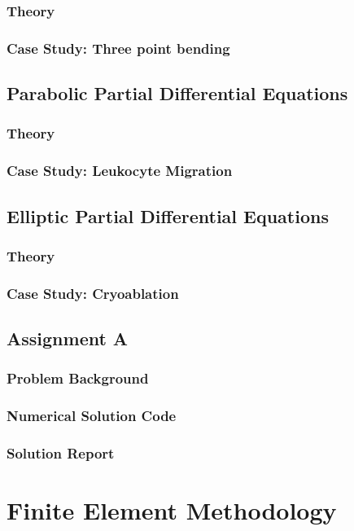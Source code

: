 \documentclass[a4paper, 11pt, oneside]{bookest}
\theoremstyle{definition}
\begin{document}
\section{Theory}
\section{Case Study: Three point bending}

\chapter{Parabolic Partial Differential Equations}
\section{Theory}
\section{Case Study: Leukocyte Migration}

\chapter{Elliptic Partial Differential Equations}
\section{Theory}
\section{Case Study: Cryoablation}

\chapter{Assignment A}
\section{Problem Background}
\section{Numerical Solution Code}
\section{Solution Report}

\part{Finite Element Methodology}
\end{document}
